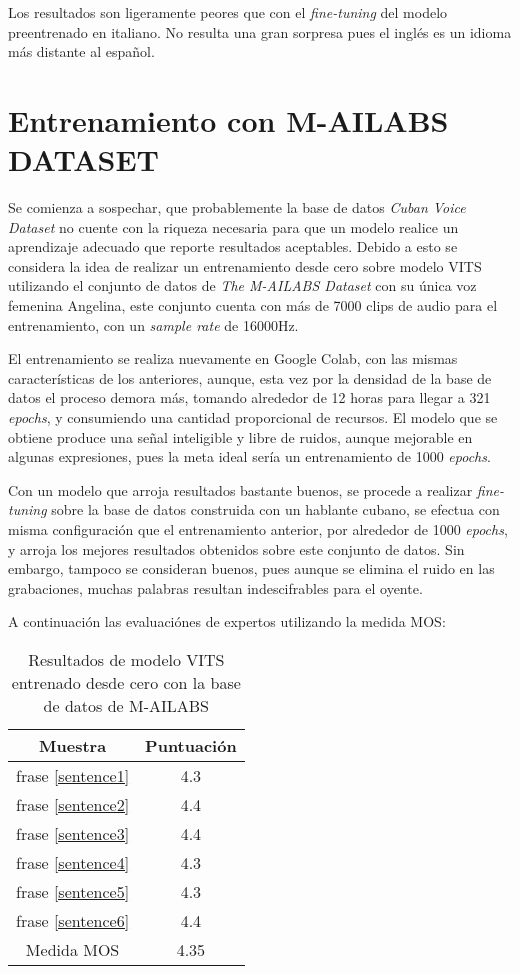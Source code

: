 Los resultados son ligeramente peores que con el \textit{fine-tuning} del modelo preentrenado en italiano. No resulta una gran sorpresa pues el inglés es un idioma más distante al español.

\section{Entrenamiento con M-AILABS DATASET} \label{vits_angel}
Se comienza a sospechar, que probablemente la base de datos \textit{Cuban Voice Dataset} no cuente con la riqueza necesaria para que un modelo realice un aprendizaje adecuado que reporte resultados aceptables. Debido a esto se considera la idea de realizar un entrenamiento desde cero sobre modelo VITS utilizando el conjunto de datos de \textit{The M-AILABS Dataset} con su única voz femenina Angelina, este conjunto cuenta con más de 7000 clips de audio para el entrenamiento, con un \textit{sample rate} de 16000Hz.

El entrenamiento se realiza nuevamente en Google Colab, con las mismas características de los anteriores, aunque, esta vez por la densidad de la base de datos el proceso demora más, tomando alrededor de 12 horas para llegar a 321 \textit{epochs}, y consumiendo una cantidad proporcional de recursos. El modelo que se obtiene produce una señal inteligible y libre de ruidos, aunque mejorable en algunas expresiones, pues la meta ideal sería un entrenamiento de 1000 \textit{epochs}.

Con un modelo que arroja resultados bastante buenos, se procede a realizar \textit{fine-tuning} sobre la base de datos construida con un hablante cubano, se efectua con misma configuración que el entrenamiento anterior, por alrededor de 1000 \textit{epochs}, y arroja los mejores resultados obtenidos sobre este conjunto de datos. Sin embargo, tampoco se consideran buenos, pues aunque se elimina el ruido en las grabaciones, muchas palabras resultan indescifrables para el oyente.

A continuación las evaluaciónes de expertos utilizando la medida MOS:


\begin{table}[H]
	\begin{center} 
\begin{tabular}{ |c|c| } 
	\hline
	Muestra & Puntuación \\
	\hline
	frase \ref{sentence1} & 4.3 \\
	frase \ref{sentence2} & 4.4 \\
	frase \ref{sentence3} & 4.4 \\
	frase \ref{sentence4} & 4.3 \\
	frase \ref{sentence5} & 4.3 \\
	frase \ref{sentence6} & 4.4 \\
	\hline
	Medida MOS & 4.35\\
	\hline
\end{tabular}
\caption{Resultados de modelo VITS entrenado desde cero con la base de datos de M-AILABS} 
\end{center}
\end{table}
	
